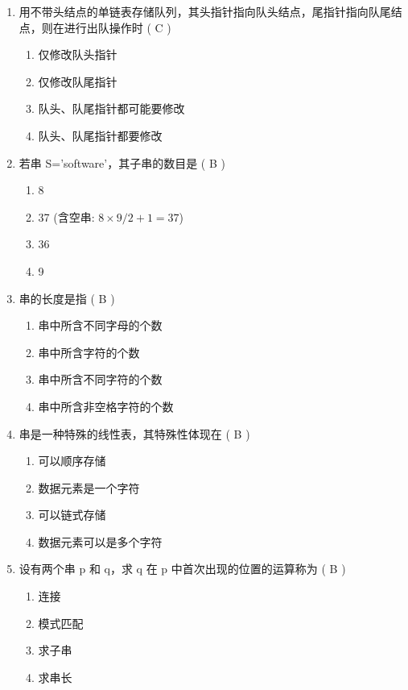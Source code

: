 \documentclass[12pt, a4paper]{article}
\begin{document}
\begin{enumerate}[label=\arabic*.]
    \item 用不带头结点的单链表存储队列，其头指针指向队头结点，尾指针指向队尾结点，则在进行出队操作时 ( C )
    \begin{enumerate}
        \item 仅修改队头指针
        \item 仅修改队尾指针
        \item 队头、队尾指针都可能要修改
        \item 队头、队尾指针都要修改
    \end{enumerate}

    \item 若串 S='software'，其子串的数目是 ( B )
    \begin{enumerate}
        \item 8
        \item 37 (含空串: $8 \times 9 / 2 + 1 = 37$)
        \item 36
        \item 9
    \end{enumerate}

    \item 串的长度是指 ( B )
    \begin{enumerate}
        \item 串中所含不同字母的个数
        \item 串中所含字符的个数
        \item 串中所含不同字符的个数
        \item 串中所含非空格字符的个数
    \end{enumerate}

    \item 串是一种特殊的线性表，其特殊性体现在 ( B )
    \begin{enumerate}
        \item 可以顺序存储
        \item 数据元素是一个字符
        \item 可以链式存储
        \item 数据元素可以是多个字符
    \end{enumerate}

    \item 设有两个串 p 和 q，求 q 在 p 中首次出现的位置的运算称为 ( B )
    \begin{enumerate}
        \item 连接
        \item 模式匹配
        \item 求子串
        \item 求串长
    \end{enumerate}


\end{enumerate}
\end{document}
